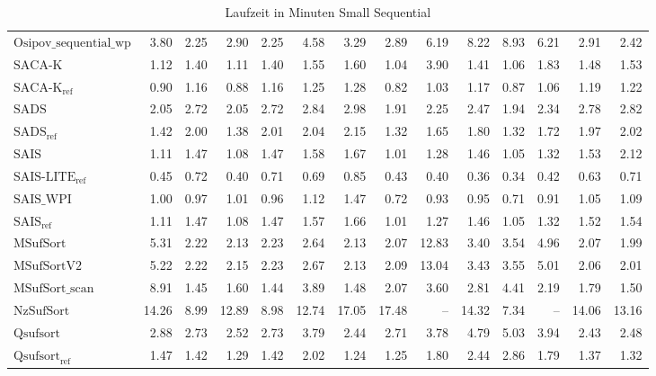 \begin{table}
{\begin{tabular}{lrrrrrrrrrrrrr}
    $\text{Osipov\_sequential\_wp}$ & 3.80 & 2.25 & 2.90 & 2.25 & 4.58 & 3.29 & 2.89 & 6.19 & 8.22 & 8.93 & 6.21 & 2.91 & 2.42 \\
    $\text{SACA-K}$ & 1.12 & 1.40 & 1.11 & 1.40 & 1.55 & 1.60 & 1.04 & 3.90 & 1.41 & 1.06 & 1.83 & 1.48 & 1.53 \\
    $\text{SACA-K}_{\text{ref}}$ & 0.90 & 1.16 & 0.88 & 1.16 & 1.25 & 1.28 & 0.82 & 1.03 & 1.17 & 0.87 & 1.06 & 1.19 & 1.22 \\
    $\text{SADS}$ & 2.05 & 2.72 & 2.05 & 2.72 & 2.84 & 2.98 & 1.91 & 2.25 & 2.47 & 1.94 & 2.34 & 2.78 & 2.82 \\
    $\text{SADS}_{\text{ref}}$ & 1.42 & 2.00 & 1.38 & 2.01 & 2.04 & 2.15 & 1.32 & 1.65 & 1.80 & 1.32 & 1.72 & 1.97 & 2.02 \\
    $\text{SAIS}$ & 1.11 & 1.47 & 1.08 & 1.47 & 1.58 & 1.67 & 1.01 & 1.28 & 1.46 & 1.05 & 1.32 & 1.53 & 2.12 \\
    $\text{SAIS-LITE}_{\text{ref}}$ & {\color{green!60!black}0.45} & 0.72 & {\color{green!60!black}0.40} & 0.71 & 0.69 & 0.85 & {\color{green!60!black}0.43} & {\color{green!60!black}0.40} & {\color{green!60!black}0.36} & {\color{green!60!black}0.34} & {\color{green!60!black}0.42} & 0.63 & 0.71 \\
    $\text{SAIS\_WPI}$ & 1.00 & 0.97 & 1.01 & 0.96 & 1.12 & 1.47 & 0.72 & 0.93 & 0.95 & 0.71 & 0.91 & 1.05 & 1.09 \\
    $\text{SAIS}_{\text{ref}}$ & 1.11 & 1.47 & 1.08 & 1.47 & 1.57 & 1.66 & 1.01 & 1.27 & 1.46 & 1.05 & 1.32 & 1.52 & 1.54 \\
    $\text{MSufSort}$ & 5.31 & 2.22 & 2.13 & 2.23 & 2.64 & 2.13 & 2.07 & {\color{red}12.83} & 3.40 & 3.54 & 4.96 & 2.07 & 1.99 \\
    $\text{MSufSortV2}$ & 5.22 & 2.22 & 2.15 & 2.23 & 2.67 & 2.13 & 2.09 & {\color{red}13.04} & 3.43 & 3.55 & 5.01 & 2.06 & 2.01 \\
    $\text{MSufSort\_scan}$ & 8.91 & 1.45 & 1.60 & 1.44 & 3.89 & 1.48 & 2.07 & 3.60 & 2.81 & 4.41 & 2.19 & 1.79 & 1.50 \\
    $\text{NzSufSort}$ & {\color{red}14.26} & {\color{red}8.99} & {\color{red}12.89} & {\color{red}8.98} & 12.74 & {\color{red}17.05} & {\color{red}17.48} & {\color{darkgray}--} & 14.32 & 7.34 & {\color{darkgray}--} & {\color{red}14.06} & {\color{red}13.16} \\
    $\text{Qsufsort}$ & 2.88 & 2.73 & 2.52 & 2.73 & 3.79 & 2.44 & 2.71 & 3.78 & 4.79 & 5.03 & 3.94 & 2.43 & 2.48 \\
    $\text{Qsufsort}_{\text{ref}}$ & 1.47 & 1.42 & 1.29 & 1.42 & 2.02 & 1.24 & 1.25 & 1.80 & 2.44 & 2.86 & 1.79 & 1.37 & 1.32 \\
\bottomrule
\end{tabular}
}
\caption{Laufzeit in Minuten Small Sequential}
\label{messung:tab:mem-small-seq-none}
\end{table}
